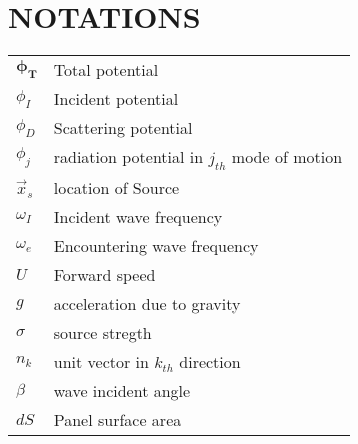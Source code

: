 \chapter*{\centering NOTATIONS}
\vspace{0.5cm}
\begin{table}[h]
\centering
\setlength{\tabcolsep}{12pt}
\renewcommand{\arraystretch}{1.5} %
\begin{tabular}{ll}
    $\boldsymbol{\phi_T}$   &    Total potential \\
    $\phi_I$ & Incident potential \\
    $\phi_D$ & Scattering potential \\
    $\phi_j$ & radiation potential in $j_{th}$ mode of motion \\
    $\vec{x}_s$ & location of Source \\
    $\omega_I$ & Incident wave frequency \\
    $\omega_e$ & Encountering wave frequency \\
    $U$ & Forward speed \\
    $g$ & acceleration due to gravity \\
    $\sigma$ & source stregth \\
    $n_k$ & unit vector in $k_{th}$ direction \\
    $\beta$ & wave incident angle \\
    $dS$  & Panel surface area \\
\end{tabular}
\end{table}